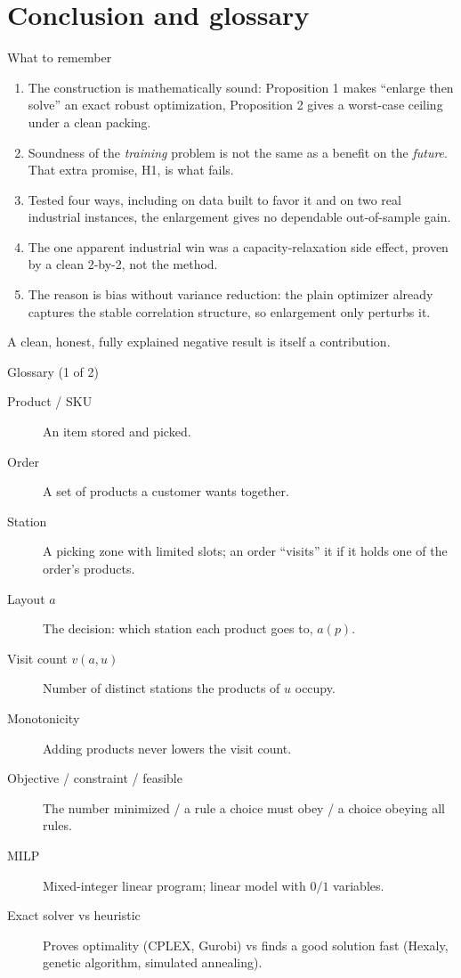 \documentclass[11pt,aspectratio=169]{beamer}
\begin{document}
\section{Conclusion and glossary}

\begin{frame}{What to remember}
  \begin{enumerate}
    \item The construction is mathematically sound: Proposition 1 makes ``enlarge then solve'' an exact robust optimization, Proposition 2 gives a worst-case ceiling under a clean packing.
    \item Soundness of the \emph{training} problem is not the same as a benefit on the \emph{future}. That extra promise, H1, is what fails.
    \item Tested four ways, including on data built to favor it and on two real industrial instances, the enlargement gives no dependable out-of-sample gain.
    \item The one apparent industrial win was a capacity-relaxation side effect, proven by a clean 2-by-2, not the method.
    \item The reason is bias without variance reduction: the plain optimizer already captures the stable correlation structure, so enlargement only perturbs it.
  \end{enumerate}
  A clean, honest, fully explained negative result is itself a contribution.
\end{frame}

\begin{frame}{Glossary (1 of 2)}
  \footnotesize
  \begin{description}
    \item[Product / SKU] An item stored and picked.
    \item[Order] A set of products a customer wants together.
    \item[Station] A picking zone with limited slots; an order ``visits'' it if it holds one of the order's products.
    \item[Layout $a$] The decision: which station each product goes to, $a(p)$.
    \item[Visit count $v(a,u)$] Number of distinct stations the products of $u$ occupy.
    \item[Monotonicity] Adding products never lowers the visit count.
    \item[Objective / constraint / feasible] The number minimized / a rule a choice must obey / a choice obeying all rules.
    \item[MILP] Mixed-integer linear program; linear model with $0/1$ variables.
    \item[Exact solver vs heuristic] Proves optimality (CPLEX, Gurobi) vs finds a good solution fast (Hexaly, genetic algorithm, simulated annealing).
  \end{description}
\end{frame}
\end{document}
